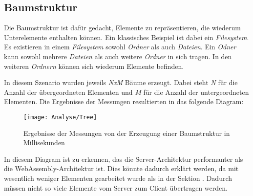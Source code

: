 \subsection{Baumstruktur}
\label{subsec:tree}
Die Baumstruktur ist dafür gedacht, Elemente zu repräsentieren, die wiederum Unterelemente
enthalten können. Ein klassisches Beispiel ist dabei ein \emph{Filesystem}. Es existieren in
einem \emph{Filesystem} sowohl \emph{Ordner} als auch \emph{Dateien}. Ein \emph{Odner} kann
sowohl mehrere \emph{Dateien} als auch weitere \emph{Ordner} in sich tragen. In den weiteren
\emph{Ordnern} können sich wiederum Elemente befinden.

In diesem Szenario wurden jeweils \emph{NxM} Bäume erzeugt. Dabei steht \emph{N} für die Anzahl
der übergeordneten Elementen und \emph{M} für die Anzahl der untergeordneten Elementen. Die
Ergebnisse der Messungen resultierten in das folgende Diagram:

\begin{figure}[h]
    \centering
    \texttt{[image: Analyse/Tree]}
    \caption[Ergebnisse der Messungen von der Erzeugung einer Baumstruktur in
    Millisekunden]{Ergebnisse
    der Messungen von der Erzeugung einer Baumstruktur in Millisekunden}
    \label{img:table}
\end{figure}

In diesem Diagram ist zu erkennen, das die Server-Architektur performanter als die
WebAssembly-Architektur ist. Dies könnte dadurch erklärt werden, da mit wesentlich weniger
Elementen gearbeitet wurde als in der Sektion \emph{}. Dadurch müssen nicht
so viele Elemente vom Server zum Client übertragen werden.
